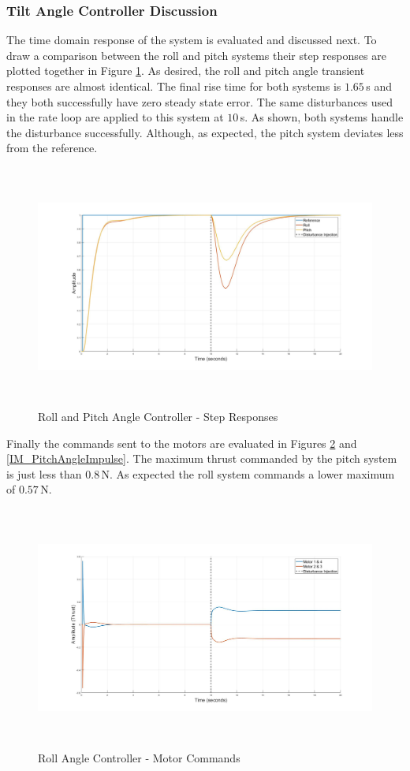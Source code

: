 \documentclass[12pt]{report}
\begin{document}
\subsubsection{Tilt Angle Controller Discussion}
The time domain response of the system is evaluated and discussed next. To draw a comparison between the roll and pitch systems their step responses are plotted together in Figure \ref{IM_RollAngleStep}. As desired, the roll and pitch angle transient responses are almost identical. The final rise time for both systems is $1.65$\,s and they both successfully have zero steady state error. The same disturbances used in the rate loop are applied to this system at $10$\,s. As shown, both systems handle the disturbance successfully. Although, as expected, the pitch system deviates less from the reference.

\begin{figure}[H]
	\centering
	\includegraphics[height = 8cm]{../Design/Matlab/Controllers/roll_pitch_angle_step.jpg}
	\caption{Roll and Pitch Angle Controller -  Step Responses}
	\label{IM_RollAngleStep}
\end{figure}

Finally the commands sent to the motors are evaluated in Figures \ref{IM_RollAngleImpulse} and \ref{IM_PitchAngleImpulse}. The maximum thrust commanded by the pitch system is just less than $0.8$\,N. As expected the roll system commands a lower maximum of $0.57$\,N.

\begin{figure}[H]
	\centering
	\includegraphics[height = 8cm]{../Design/Matlab/Controllers/roll_angle_impulse.jpg}
	\caption{Roll Angle Controller -  Motor Commands}
	\label{IM_RollAngleImpulse}
\end{figure}
\end{document}
